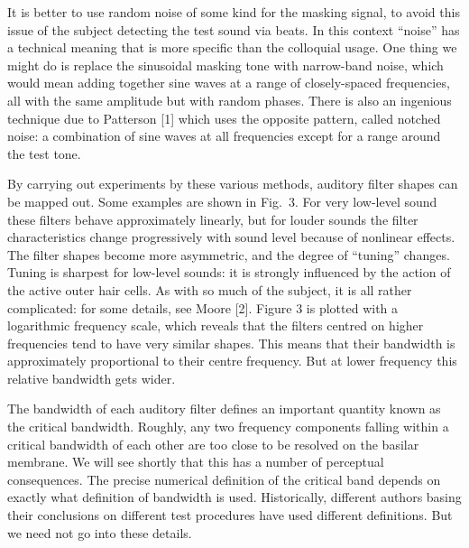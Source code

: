 
  It is better to use random noise of some kind for the masking signal, to 
  avoid this issue of the subject detecting the test sound via beats. In this 
  context ``noise'' has a technical meaning that is more specific than the 
  colloquial usage. One thing we might do is replace the sinusoidal masking 
  tone with narrow-band noise, which would mean adding together sine waves at a 
  range of closely-spaced frequencies, all with the same amplitude but with 
  random phases. There is also an ingenious technique due to Patterson [1] 
  which uses the opposite pattern, called notched noise: a combination of sine 
  waves at all frequencies except for a range around the test tone. 

  By carrying out experiments by these various methods, auditory filter shapes 
  can be mapped out. Some examples are shown in Fig.\ 3. For very low-level 
  sound these filters behave approximately linearly, but for louder sounds the 
  filter characteristics change progressively with sound level because of 
  nonlinear effects. The filter shapes become more asymmetric, and the degree 
  of ``tuning'' changes. Tuning is sharpest for low-level sounds: it is 
  strongly influenced by the action of the active outer hair cells. As with so 
  much of the subject, it is all rather complicated: for some details, see 
  Moore [2]. Figure 3 is plotted with a logarithmic frequency scale, which 
  reveals that the filters centred on higher frequencies tend to have very 
  similar shapes. This means that their bandwidth is approximately proportional 
  to their centre frequency. But at lower frequency this relative bandwidth 
  gets wider. 


  The bandwidth of each auditory filter defines an important quantity known as 
  the critical bandwidth. Roughly, any two frequency components falling within 
  a critical bandwidth of each other are too close to be resolved on the 
  basilar membrane. We will see shortly that this has a number of perceptual 
  consequences. The precise numerical definition of the critical band depends 
  on exactly what definition of bandwidth is used. Historically, different 
  authors basing their conclusions on different test procedures have used 
  different definitions. But we need not go into these details. 

